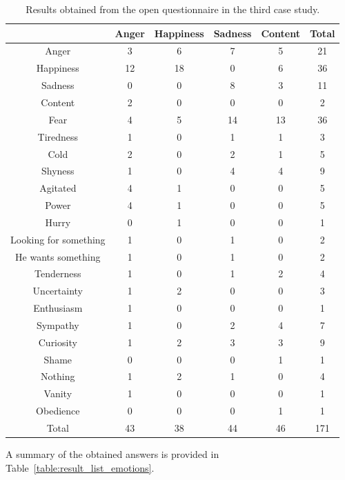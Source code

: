 \begin{table}[h]
\centering
		\caption{Results obtained from the open questionnaire in the third case study.}
		\label{table:open_questionnaire}
		\small
			\begin{tabular}{|c|c|c|c|c|c|}
				\hline
					\backslashbox{Presented}{Reported}&Anger&Happiness&Sadness&Content&Total\\
				\hline
					Anger& 3&6&7&5&21\\
				\hline
					Happiness&12& 18&0&6&36\\
				\hline
					Sadness&0&0& 8&3&11\\
				\hline
					Content&2&0&0& 0&2\\
				\hline
					Fear&4&5&14&13&36\\
				\hline
					Tiredness&1&0&1&1&3\\
				\hline
					Cold&2&0&2&1&5\\
				\hline
					Shyness&1&0&4&4&9\\
				\hline
					Agitated&4&1&0&0&5\\
				\hline
					Power&4&1&0&0&5\\
				\hline
					Hurry&0&1&0&0&1\\
				\hline
					Looking for something&1&0&1&0&2\\
				\hline
					He wants something&1&0&1&0&2\\
				\hline
					Tenderness&1&0&1&2&4\\
				\hline
					Uncertainty&1&2&0&0&3\\
				\hline
					Enthusiasm&1&0&0&0&1\\
				\hline
					Sympathy&1&0&2&4&7\\
				\hline
					Curiosity&1&2&3&3&9\\
				\hline
					Shame&0&0&0&1&1\\
				\hline
					Nothing&1&2&1&0&4\\
				\hline
					Vanity&1&0&0&0&1\\
				\hline
					Obedience&0&0&0&1&1\\
				\hline
					Total&43&38&44&46&171\\
				\hline
			\end{tabular}
\end{table}

A summary of the obtained answers is provided in Table~\ref{table:result_list_emotions}.

